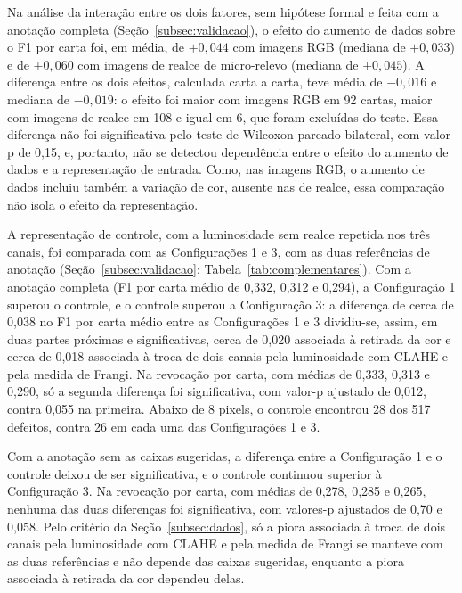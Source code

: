 \documentclass[
    12pt,                %
    openright,           %
    oneside,             %
    a4paper,             %
    english,             %
    brazil               %
]{abntex2}
\begin{document}
Na análise da interação entre os dois fatores, sem hipótese formal e feita com a
anotação completa (Seção~\ref{subsec:validacao}), o efeito do aumento de
dados sobre o F1 por carta foi, em média, de $+0{,}044$ com imagens RGB
(mediana de $+0{,}033$) e de $+0{,}060$ com imagens de realce de
micro-relevo (mediana de $+0{,}045$). A diferença entre os dois efeitos,
calculada carta a carta, teve média de $-0{,}016$ e mediana de
$-0{,}019$: o efeito foi maior com imagens RGB em 92 cartas, maior com
imagens de realce em 108 e igual em 6, que foram excluídas do teste. Essa
diferença não foi significativa pelo teste de Wilcoxon pareado bilateral,
com valor-p de 0,15, e, portanto, não se detectou dependência entre o
efeito do aumento de dados e a representação de entrada. Como, nas
imagens RGB, o aumento de dados incluiu também a variação de cor,
ausente nas de realce, essa comparação não isola o efeito da
representação.

A representação de controle, com a luminosidade sem realce repetida nos
três canais, foi comparada com as Configurações 1 e 3, com as duas
referências de anotação (Seção~\ref{subsec:validacao};
Tabela~\ref{tab:complementares}). Com a anotação completa (F1 por
carta médio de 0,332, 0,312 e 0,294), a
Configuração 1 superou o controle, e o controle superou a
Configuração 3: a diferença de cerca de 0,038 no F1 por carta médio
entre as Configurações 1 e 3 dividiu-se, assim, em duas partes próximas
e significativas, cerca de 0,020 associada à retirada da cor e cerca de
0,018 associada à troca de dois canais pela luminosidade com CLAHE e
pela medida de Frangi. Na revocação por carta, com médias de 0,333,
0,313 e 0,290, só a segunda diferença foi significativa, com valor-p
ajustado de 0,012, contra 0,055 na primeira. Abaixo de 8 pixels, o controle encontrou
28 dos 517 defeitos, contra 26 em cada uma das Configurações 1 e 3.

Com a anotação sem as caixas sugeridas, a diferença entre a
Configuração 1 e o controle deixou de ser significativa, e o controle
continuou superior à Configuração 3. Na revocação por carta, com
médias de 0,278, 0,285 e 0,265, nenhuma das duas diferenças foi
significativa, com valores-p ajustados de 0,70 e 0,058. Pelo critério
da Seção~\ref{subsec:dados}, só a piora associada à troca de dois canais
pela luminosidade com CLAHE e pela medida de Frangi se manteve com as
duas referências e não depende das caixas sugeridas, enquanto a piora associada
à retirada da cor dependeu delas.
\end{document}
